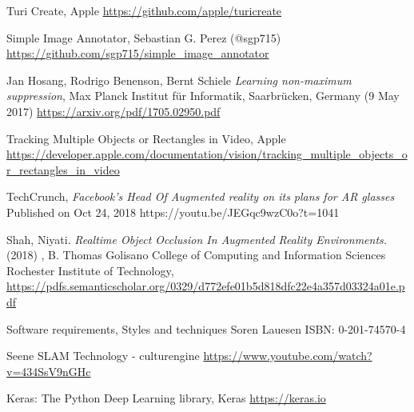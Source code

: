 \begin{thebibliography}{X}
Turi Create, Apple
\url{https://github.com/apple/turicreate}

Simple Image Annotator, Sebastian G. Perez (@sgp715)
\url{https://github.com/sgp715/simple_image_annotator}


Jan Hosang, Rodrigo Benenson, Bernt Schiele \textit{Learning non-maximum suppression}, Max Planck Institut für Informatik, Saarbrücken, Germany (9 May 2017)
\url{https://arxiv.org/pdf/1705.02950.pdf}


Tracking Multiple Objects or Rectangles in Video, Apple
\url{https://developer.apple.com/documentation/vision/tracking_multiple_objects_or_rectangles_in_video}

TechCrunch, \textit{Facebook's Head Of Augmented reality on its plans for AR glasses}
Published on Oct 24, 2018
https://youtu.be/JEGqc9wzC0o?t=1041

Shah, Niyati. \textit{Realtime Object Occlusion In Augmented Reality Environments.} (2018) , B. Thomas Golisano College of Computing and Information Sciences Rochester Institute of Technology, 
\url{https://pdfs.semanticscholar.org/0329/d772efe01b5d818dfc22e4a357d03324a01e.pdf} 

Software requirements, Styles and techniques
Soren Lauesen
ISBN: 0-201-74570-4

Seene SLAM Technology - culturengine
\url{https://www.youtube.com/watch?v=434SsV9nGHc}

Keras: The Python Deep Learning library, Keras
\url{https://keras.io}

\end{thebibliography}
